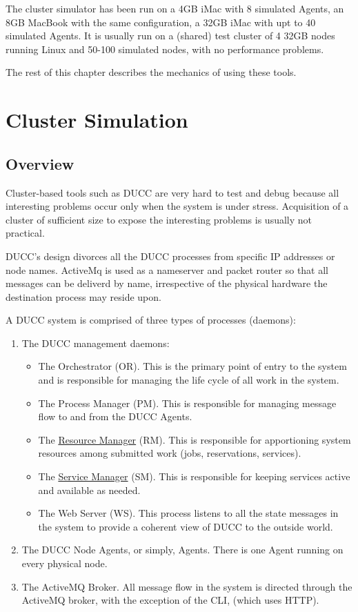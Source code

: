     The cluster simulator has been run on a 4GB iMac with 8 simulated Agents, an 8GB MacBook with
    the same configuration, a 32GB iMac with upt to 40 simulated Agents.  It is usually run on a
    (shared) test cluster of 4 32GB nodes running Linux and 50-100 simulated nodes, with no
    performance problems.

    The rest of this chapter describes the mechanics of using these tools.

\section{Cluster Simulation}

    \subsection{Overview}
    Cluster-based tools such as DUCC are very hard to test and debug
    because all interesting problems occur only when the system is
    under stress.  Acquisition of a cluster of sufficient size to 
    expose the interesting problems is usually not practical.

    DUCC's design divorces all the DUCC processes from specific IP
    addresses or node names.  ActiveMq is used as a nameserver and
    packet router so that all messages can be deliverd by name,
    irrespective of the physical hardware the destination process
    may reside upon.  

    A DUCC system is comprised of three types of processes (daemons):
    \begin{enumerate}
      \item The DUCC management daemons: 
        \begin{itemize}
           \item The Orchestrator (OR). This is the primary point of
             entry to the system and is responsible for managing
             the life cycle of all work in the system.
           \item The Process Manager (PM).  This is responsible for
             managing message flow to and from the DUCC Agents.
           \item The \hyperref[chap:rm]{Resource Manager} (RM). This is responsible for
             apportioning system resources among submitted work 
             (jobs, reservations, services).
           \item The \hyperref[chap:services]{Service Manager} (SM). This is responsible for
             keeping services active and available as needed.
           \item The Web Server (WS). This process listens to all
             the state messages in the system to provide a coherent
             view of DUCC to the outside world.
        \end{itemize}
        \item The DUCC Node Agents, or simply, Agents.  There is
          one Agent running on every physical node.
        \item The ActiveMQ Broker.  All message flow in the system
          is directed through the ActiveMQ broker, with the exception
          of the CLI, (which uses HTTP).
    \end{enumerate}
    
